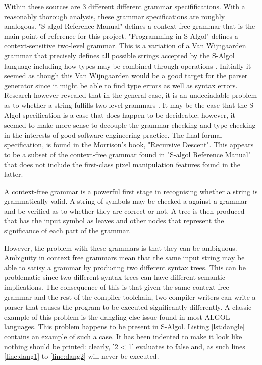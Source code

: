 \documentclass{article}
\begin{document}
Within these sources are 3 different different grammar specififications. With a reasonably thorough analysis, these grammar specifications are roughly analogous. "S-algol Reference Manual" defines a context-free grammar that is the main point-of-reference for this project. "Programming in S-Algol" defines a context-sensitive two-level grammar. This is a variation of a Van Wijngaarden grammar that precisely defines all possible strings accepted by the S-Algol language including how types may be combined through operations \cite{TODO}. Initially it seemed as though this Van Wijngaarden would be a good target for the parser generator since it might be able to find type errors as well as syntax errors. Research however revealed that in the general case, it is an undeciadable problem as to whether a string fulfills two-level grammars \cite{TODO}. It may be the case that the S-Algol specification is a case that does happen to be decideable; however, it seemed to make more sense to decouple the grammar-checking and type-checking in the interests of good software engineering practice. The final formal specification, is found in the Morrison's book, "Recursive Descent". This appears to be a subset of the context-free grammar found in "S-algol Reference Manual" that does not include the first-class pixel manipulation features found in the latter.

A context-free grammar is a powerful first stage in recognising whether a string is grammatically valid. A string of symbols may be checked a against a grammar and be verified as to whether they are correct or not. A tree is then produced that has the input symbol as leaves and other nodes that represent the significance of each part of the grammar.

However, the problem with these grammars is that they can be ambiguous. Ambiguity in context free grammars mean that the same input string may be able to satisy a grammar by producing two different syntax trees. This can be problematic since two different syntax trees can have different semantic implications. The consequence of this is that given the same context-free grammar and the rest of the compiler toolchain, two compiler-writers can write a parser that causes the program to be executed significantly differently. A classic example of this problem is the dangling else issue found in most ALGOL languages. This problem happens to be present in S-Algol. Listing \ref{lst:dangle} contains an example of such a case. It has been indented to make it look like nothing should be printed: clearly, '2 < 1' evaluates to false and, as such lines \ref{line:dang1} to \ref{line:dang2} will never be executed.
\end{document}
